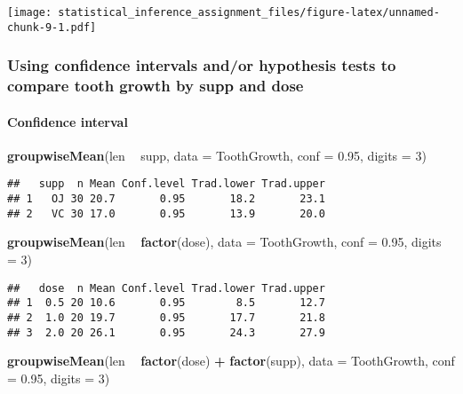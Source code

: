 \documentclass[]{article}
\newenvironment{Shaded}{\begin{snugshade}}{\end{snugshade}}
\newcommand{\KeywordTok}[1]{\textcolor[rgb]{0.13,0.29,0.53}{\textbf{#1}}}
\newcommand{\DataTypeTok}[1]{\textcolor[rgb]{0.13,0.29,0.53}{#1}}
\newcommand{\DecValTok}[1]{\textcolor[rgb]{0.00,0.00,0.81}{#1}}
\newcommand{\FloatTok}[1]{\textcolor[rgb]{0.00,0.00,0.81}{#1}}
\newcommand{\StringTok}[1]{\textcolor[rgb]{0.31,0.60,0.02}{#1}}
\newcommand{\OperatorTok}[1]{\textcolor[rgb]{0.81,0.36,0.00}{\textbf{#1}}}
\newcommand{\NormalTok}[1]{#1}
\let\oldparagraph\paragraph
\renewcommand{\paragraph}[1]{\oldparagraph{#1}\mbox{}}
\begin{document}
\texttt{[image: statistical\_inference\_assignment\_files/figure-latex/unnamed-chunk-9-1.pdf]}

\subsubsection{Using confidence intervals and/or hypothesis tests to
compare tooth growth by supp and
dose}\label{using-confidence-intervals-andor-hypothesis-tests-to-compare-tooth-growth-by-supp-and-dose}

\paragraph{Confidence interval}\label{confidence-interval}

\begin{Shaded}
\begin{Highlighting}[]
\KeywordTok{groupwiseMean}\NormalTok{(len }\OperatorTok{~}\StringTok{ }\NormalTok{supp, }\DataTypeTok{data =}\NormalTok{ ToothGrowth, }\DataTypeTok{conf =} \FloatTok{0.95}\NormalTok{, }\DataTypeTok{digits =} \DecValTok{3}\NormalTok{)}
\end{Highlighting}
\end{Shaded}

\begin{verbatim}
##   supp  n Mean Conf.level Trad.lower Trad.upper
## 1   OJ 30 20.7       0.95       18.2       23.1
## 2   VC 30 17.0       0.95       13.9       20.0
\end{verbatim}

\begin{Shaded}
\begin{Highlighting}[]
\KeywordTok{groupwiseMean}\NormalTok{(len }\OperatorTok{~}\StringTok{ }\KeywordTok{factor}\NormalTok{(dose), }\DataTypeTok{data =}\NormalTok{ ToothGrowth, }\DataTypeTok{conf =} \FloatTok{0.95}\NormalTok{, }\DataTypeTok{digits =} \DecValTok{3}\NormalTok{)}
\end{Highlighting}
\end{Shaded}

\begin{verbatim}
##   dose  n Mean Conf.level Trad.lower Trad.upper
## 1  0.5 20 10.6       0.95        8.5       12.7
## 2  1.0 20 19.7       0.95       17.7       21.8
## 3  2.0 20 26.1       0.95       24.3       27.9
\end{verbatim}

\begin{Shaded}
\begin{Highlighting}[]
\KeywordTok{groupwiseMean}\NormalTok{(len }\OperatorTok{~}\StringTok{ }\KeywordTok{factor}\NormalTok{(dose) }\OperatorTok{+}\StringTok{ }\KeywordTok{factor}\NormalTok{(supp), }\DataTypeTok{data =}\NormalTok{ ToothGrowth, }\DataTypeTok{conf =} \FloatTok{0.95}\NormalTok{, }\DataTypeTok{digits =} \DecValTok{3}\NormalTok{)}
\end{Highlighting}
\end{Shaded}
\end{document}
